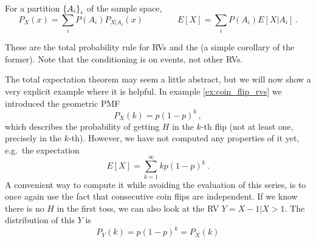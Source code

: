 \begin{prop}
For a partition $\qty{A_i}_i$ of the sample space,
\begin{equation}
P_X(x) = \sum_i P(A_i) P_{X | A_i}(x) \qquad \qquad E[X] = \sum_i P(A_i) E[X | A_i] \, .
\end{equation}
\end{prop}
These are the total probability rule for RVs and the  (a simple corollary of the former). Note that the conditioning is on events, not other RVs.


\begin{ex}[Memorylessness]
The total expectation theorem may seem a little abstract, but we will now show a very explicit example where it is helpful. In example \ref{ex:coin_flip_rvs} we introduced the geometric PMF
\begin{equation*}
P_X(k) = p (1 - p)^k \, ,
\end{equation*}
which describes the probability of getting $H$ in the $k$-th flip (not at least one, precisely in the $k$-th). However, we have not computed any properties of it yet, e.g.~the expectation
\begin{equation*}
E[X] = \sum_{k = 1}^\infty k p (1 - p)^k \, .
\end{equation*}
A convenient way to compute it while avoiding the evaluation of this series, is to once again use the fact that consecutive coin flips are independent. If we know there is no $H$ in the first toss, we can also look at the RV $Y = X - 1 | X > 1$. The distribution of this $Y$ is
\begin{equation*}
P_Y(k) = p (1 - p)^k = P_X(k)
\end{equation*} 

\end{ex}
